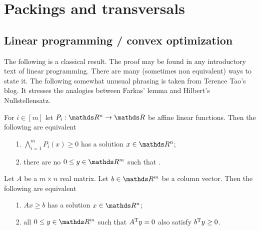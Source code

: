 \documentclass[sputnik.tex]{subfiles}
\begin{document}
\def\Fr{\mathop{\rm Fr}}

\def\vc{{\footnotesize VC}}
\def\nip{{\footnotesize NIP}}


\def\medrel#1{\parbox[t]{6ex}{$\displaystyle\hfil #1$}}
\def\ceq#1#2#3{\parbox[t]{15ex}{$\displaystyle #1$}\medrel{#2}{$\displaystyle #3$}}



\chapter{Packings and transversals}



\section{Linear programming / convex optimization}\label{LP}

The following is a classical result.
The proof may be found in any introductory text of linear programming.
There are many (sometimes non equivalent) ways to state it.
The following somewhat unusual phrasing is taken from Terence Tao's blog.
It stresses the analogies between Farkas' lemma and Hilbert's Nullstellensatz.

\begin{proposition}
For $i\in[m]$ let $P_i:\RR^n\to\RR$ be affine linear functions.
Then the following are equivalent
\nobreak  
\begin{itemize}
\item[1.] $\displaystyle\bigwedge^m_{i=1}P_i(x)\ge 0$ has a solution $x\in\RR^n$;
\item[2.] there are no $0\le y\in\RR^m$ such that .\QED
\end{itemize}
\end{proposition}



\begin{proposition}
Let $A$ be a $m\times n$ real matrix. 
Let $b\in\RR^m$ be a column vector.
Then the following are equivalent
\nobreak  
\begin{itemize}
\item[1.] $Ax\ge b$ has a solution $x\in\RR^n$;
\item[2.] all $0\le y\in\RR^m$ such that $A^{\rm T}y=0$ also satisfy $b^{\rm T}y\ge0$.\QED
\end{itemize}
\end{proposition}
\end{document}
